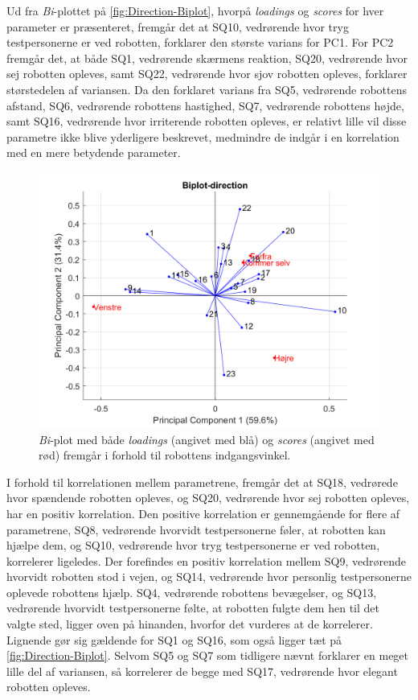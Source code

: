 \noindent
%
Ud fra \textit{Bi}-plottet på \autoref{fig:Direction-Biplot}, hvorpå \textit{loadings} og \textit{scores} for hver parameter er præsenteret, fremgår det at SQ10, vedrørende hvor tryg testpersonerne er ved robotten, forklarer den største varians for PC1. For PC2 fremgår det, at både SQ1, vedrørende skærmens reaktion, SQ20, vedrørende hvor sej robotten opleves, samt SQ22, vedrørende hvor sjov robotten opleves, forklarer størstedelen af variansen. Da den forklaret varians fra SQ5, vedrørende robottens afstand, SQ6, vedrørende robottens hastighed, SQ7, vedrørende robottens højde, samt SQ16, vedrørende hvor irriterende robotten opleves, er relativt lille vil disse parametre ikke blive yderligere beskrevet, medmindre de indgår i en korrelation med en mere betydende parameter.  
%
\begin{figure}[H]
\centering
\includegraphics[width=\textwidth]{Figure/DatabehandlingSkalaer/PCAfigures/Direction-Biplot.png}
\caption{\textit{Bi}-plot med både \textit{loadings} (angivet med blå) og \textit{scores} (angivet med rød) fremgår i forhold til robottens indgangsvinkel.}
\label{fig:Direction-Biplot}
\end{figure}
\noindent
%
I forhold til korrelationen mellem parametrene, fremgår det at SQ18, vedrørede hvor spændende robotten opleves, og SQ20, vedrørende hvor sej robotten opleves, har en positiv korrelation. Den positive korrelation er gennemgående for flere af parametrene, SQ8, vedrørende hvorvidt testpersonerne føler, at robotten kan hjælpe dem, og SQ10, vedrørende hvor tryg testpersonerne er ved robotten, korrelerer ligeledes. Der forefindes en positiv korrelation mellem SQ9, vedrørende hvorvidt robotten stod i vejen, og SQ14, vedrørende hvor personlig testpersonerne oplevede robottens hjælp. SQ4, vedrørende robottens bevægelser, og SQ13, vedrørende hvorvidt testpersonerne følte, at robotten fulgte dem hen til det valgte sted, ligger oven på hinanden, hvorfor det vurderes at de korrelerer. Lignende gør sig gældende for SQ1 og SQ16, som også ligger tæt på \autoref{fig:Direction-Biplot}. Selvom SQ5 og SQ7 som tidligere nævnt forklarer en meget lille del af variansen, så korrelerer de begge med SQ17, vedrørende hvor elegant robotten opleves.   


